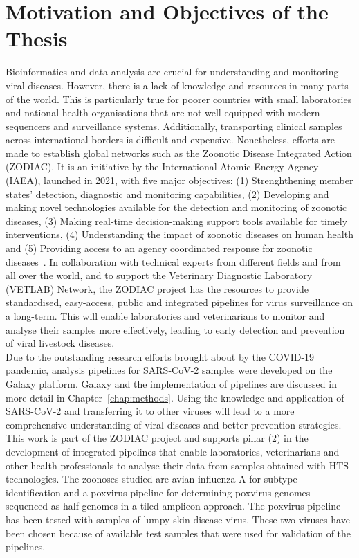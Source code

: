 \section{Motivation and Objectives of the Thesis}
Bioinformatics and data analysis are crucial for understanding and monitoring viral diseases. However, there is a lack of knowledge and resources in many parts of the world. This is particularly true for poorer countries with small laboratories and national health organisations that are not well equipped with modern sequencers and surveillance systems. Additionally, transporting clinical samples across international borders is difficult and expensive. Nonetheless, efforts are made to establish global networks such as the Zoonotic Disease Integrated Action (ZODIAC). It is an initiative by the International Atomic Energy Agency (IAEA), launched in 2021, with five major objectives: (1) Strenghthening member states' detection, diagnostic and monitoring capabilities, (2) Developing and making novel technologies available for the detection and monitoring of zoonotic diseases, (3) Making real-time decision-making support tools available for timely interventions, (4) Understanding the impact of zoonotic diseases on human health and (5) Providing access to an agency coordinated response for zoonotic diseases~\cite{zodiac2021}. In collaboration with technical experts from different fields and from all over the world, and to support the Veterinary Diagnostic Laboratory (VETLAB) Network, the ZODIAC project has the resources to provide standardised, easy-access, public and integrated pipelines for virus surveillance on a long-term. This will enable laboratories and veterinarians to monitor and analyse their samples more effectively, leading to early detection and prevention of viral livestock diseases. \\
Due to the outstanding research efforts brought about by the COVID-19 pandemic, analysis pipelines for SARS-CoV-2 samples were developed on the Galaxy platform. Galaxy and the implementation of pipelines are discussed in more detail in Chapter~\ref{chap:methods}. Using the knowledge and application of SARS-CoV-2 and transferring it to other viruses will lead to a more comprehensive understanding of viral diseases and better prevention strategies.\\
This work is part of the ZODIAC project and supports pillar (2) in the development of integrated pipelines that enable laboratories, veterinarians and other health professionals to analyse their data from samples obtained with HTS technologies. The zoonoses studied are avian influenza A for subtype identification and a poxvirus pipeline for determining poxvirus genomes sequenced as half-genomes in a tiled-amplicon approach. The poxvirus pipeline has been tested with samples of lumpy skin disease virus. These two viruses have been chosen because of available test samples that were used for validation of the pipelines. \\
